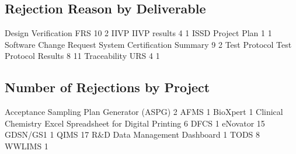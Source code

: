 \documentclass{article}
\begin{document}
\subsection{Rejection Reason by Deliverable}

\begin{Schunk}
\begin{Soutput}
         Design Verification                          FRS 
                          10                            2 
                        IIVP                 IIVP results 
                           4                            1 
                        ISSD                 Project Plan 
                           1                            1 
     Software Change Request System Certification Summary 
                           9                            2 
               Test Protocol        Test Protocol Results 
                           8                           11 
                Traceability                          URS 
                           4                            1 
\end{Soutput}
\end{Schunk}

\subsection{Number of Rejections by Project}

\begin{Schunk}
\begin{Soutput}
                Acceptance Sampling Plan Generator (ASPG) 
                                                        2 
                                                     AFMS 
                                                        1 
                                                 BioXpert 
                                                        1 
Clinical Chemistry Excel Spreadsheet for Digital Printing 
                                                        6 
                                                     DFCS 
                                                        1 
                                                 eNovator 
                                                       15 
                                                 GDSN/GS1 
                                                        1 
                                                     QIMS 
                                                       17 
                            R&D Data Management Dashboard 
                                                        1 
                                                     TODS 
                                                        8 
                                                   WWLIMS 
                                                        1 
\end{Soutput}
\end{Schunk}
\end{document}
